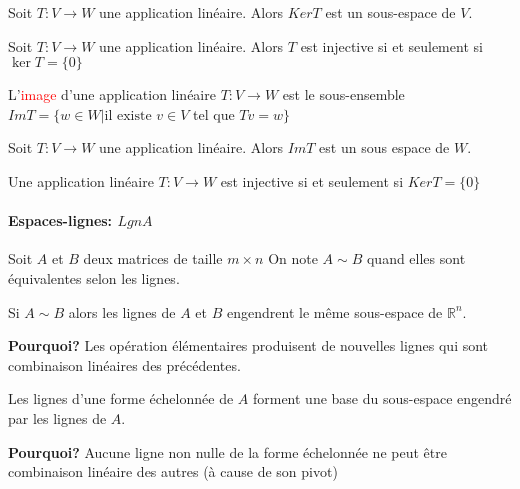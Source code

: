 \begin{theoreme}
    Soit $T: V \to W$ une application linéaire. Alors $KerT$ est un sous-espace de $V$.
\end{theoreme}
\begin{definition}
Soit $T : V \to W$ une application linéaire. Alors $T$ est injective si et seulement si $\ker T = \{0\}$ 
\end{definition}
\begin{definition}
    L'\textcolor{red}{image} d'une application linéaire $T : V \to W$ est le sous-ensemble $Im T = \{w \in W| \text{il existe } v \in V $ tel que $Tv = w\}$
\end{definition}
\begin{theoreme}
    Soit $T : V \to W$ une application linéaire. Alors $Im T$ est un sous espace de $W$.
\end{theoreme}
\begin{theoreme}
    Une application linéaire $T: V \to W$ est injective si et seulement si $Ker T = \{0\}$ 
\end{theoreme}
\paragraph{Espaces-lignes: $LgnA$}
Soit $A$ et $B$ deux matrices de taille $m\times n$ On note $A  \sim B$ quand elles sont équivalentes selon les lignes.
\begin{theoreme}
    Si $A \sim B$ alors les lignes de $A$ et $B$ engendrent le même sous-espace de $\mathbb{R}^n$.   
\end{theoreme}
\textbf{Pourquoi?} Les opération élémentaires produisent de nouvelles lignes qui sont combinaison linéaires des précédentes.
\begin{theoreme}
    Les lignes d'une forme échelonnée de $A$ forment une base du sous-espace engendré par les lignes de $A$.
\end{theoreme}
\textbf{Pourquoi?} Aucune ligne non nulle de la forme échelonnée ne peut être combinaison linéaire des autres (à cause de son pivot)

